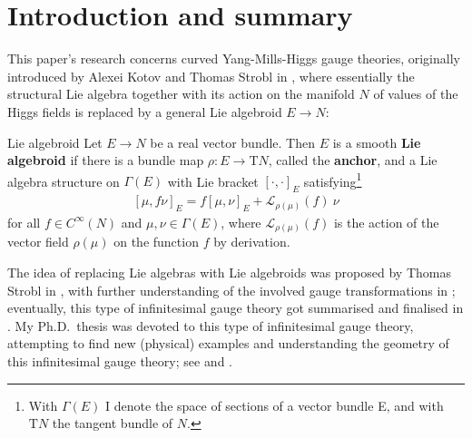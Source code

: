 \documentclass[reqno,a4paper,oneside]{amsart}
\theoremstyle{plain}
\theoremstyle{remark}
\theoremstyle{definition}
\begin{document}


\section{Introduction and summary}

This paper's research concerns curved Yang-Mills-Higgs gauge theories, originally introduced by Alexei Kotov and Thomas Strobl in \cite{CurvedYMH}, where essentially the structural Lie algebra together with its action on the manifold $N$ of values of the Higgs fields is replaced by a general Lie algebroid $E \to N$:

\begin{definitions*}{Lie algebroid}
Let $E \to N$ be a real vector bundle. Then $E$ is a smooth \textbf{Lie algebroid} if there is a bundle map $\rho: E \to \mathrm{T}N$, called the \textbf{anchor}, and a Lie algebra structure on $\Gamma(E)$ with Lie bracket $\left[ \cdot, \cdot \right]_E$ satisfying\footnote{With $\Gamma(E)$ I denote the space of sections of a vector bundle E, and with $\mathrm{T}N$ the tangent bundle of $N$.}
\begin{align*}
  \left[\mu, f \nu\right]_E = f \left[\mu, \nu\right]_E + \mathcal{L}_{\rho(\mu)}(f) ~ \nu
\end{align*}
for all $f \in C^\infty(N)$ and $\mu, \nu \in \Gamma(E)$, where $\mathcal{L}_{\rho(\mu)}(f)$ is the action of the vector field $\rho(\mu)$ on the function $f$ by derivation.
\end{definitions*}

The idea of replacing Lie algebras with Lie algebroids was proposed by Thomas Strobl in \cite{OriginofCYMH}, with further understanding of the involved gauge transformations in \cite{mayer2009lie}; eventually, this type of infinitesimal gauge theory got summarised and finalised in \cite{CurvedYMH}. My Ph.D.\ thesis was devoted to this type of infinitesimal gauge theory, attempting to find new (physical) examples and understanding the geometry of this infinitesimal gauge theory; see \cite{My1stpaper} and \cite{MyThesis}.
\end{document}
